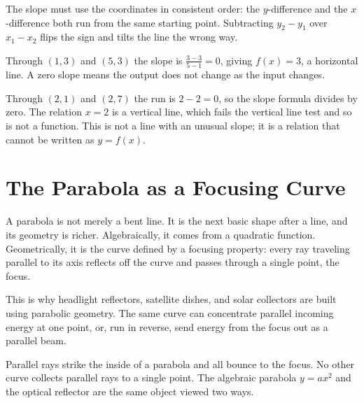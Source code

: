 \documentclass[12pt]{book}
\begin{document}
\begin{pitfall}
The slope must use the coordinates in consistent order: the $y$-difference and the
$x$-difference both run from the same starting point. Subtracting $y_2-y_1$ over
$x_1-x_2$ flips the sign and tilts the line the wrong way.
\end{pitfall}

\begin{example}
Through $(1,3)$ and $(5,3)$ the slope is $\tfrac{3-3}{5-1}=0$, giving $f(x)=3$, a
horizontal line. A zero slope means the output does not change as the input changes.

Through $(2,1)$ and $(2,7)$ the run is $2-2=0$, so the slope formula divides by
zero. The relation $x=2$ is a vertical line, which fails the vertical line test and
so is not a function. This is not a line with an unusual slope; it is a relation that
cannot be written as $y=f(x)$.
\end{example}

\section{The Parabola as a Focusing Curve}

A parabola is not merely a bent line. It is the next basic shape after a line, and
its geometry is richer. Algebraically, it comes from a quadratic function. Geometrically,
it is the curve defined by a focusing property: every ray traveling parallel to its
axis reflects off the curve and passes through a single point, the focus.

This is why headlight reflectors, satellite dishes, and solar collectors are built
using parabolic geometry. The same curve can concentrate parallel incoming energy at
one point, or, run in reverse, send energy from the focus out as a parallel beam.
\begin{visual}
Parallel rays strike the inside of a parabola and all bounce to the focus. No other
curve collects parallel rays to a single point. The algebraic parabola $y=ax^2$ and
the optical reflector are the same object viewed two ways.
\end{visual}

\begin{center}
\end{center}
\end{document}
